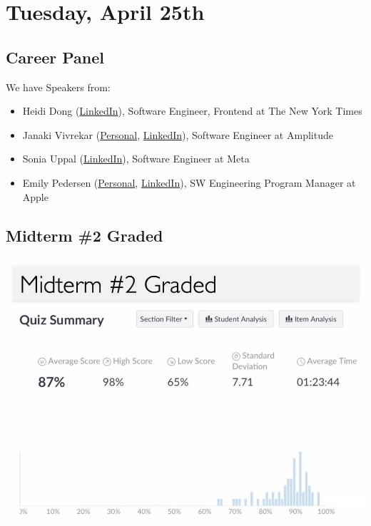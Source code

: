 \section{Tuesday, April 25th}
\subsection{Career Panel}
We have Speakers from:
\begin{itemize}
    \item Heidi Dong (\href{https://www.linkedin.com/in/heididong/}{LinkedIn}), Software Engineer, Frontend at The New York Times

    \item Janaki Vivrekar (\href{https://janakivivrekar.com/}{Personal}, \href{https://www.linkedin.com/in/janaki-vivrekar/}{LinkedIn}), Software Engineer at Amplitude

    \item Sonia Uppal (\href{https://www.linkedin.com/in/soniau/}{LinkedIn}), Software Engineer at Meta

    \item Emily Pedersen (\href{https://www.emilypedersen.me/}{Personal}, \href{https://www.linkedin.com/in/epedersen1/}{LinkedIn}), SW Engineering Program Manager at Apple
\end{itemize}

\subsection{Midterm \#2 Graded}
\includegraphics{lectures/wk14/img/mt2_distro.png}

